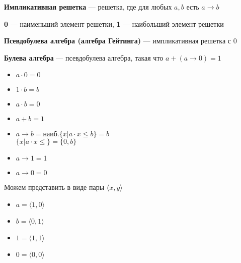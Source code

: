 \documentclass[oneside]{book}
\begin{document}
\begin{definition}
	\textbf{Импликативная решетка} --- решетка, где для любых \(a, b\) есть \(a \to b\)
	\label{org2d420d7}
\end{definition}
\begin{definition}
	\textbf{0} --- наименьший элемент решетки, \textbf{1} --- наибольший элемент решетки
	\label{orgc5f1084}
\end{definition}
\begin{definition}
	\textbf{Псевдобулева алгебра (алгебра Гейтинга)} --- импликативная решетка с \(0\)
	\label{orgb0b24d7}
\end{definition}
\begin{definition}
	\textbf{Булева алгебра} --- псевдобулева алгебра, такая что \(a + (a \to 0) = 1\)
	\label{org09eb6dc}
\end{definition}
\begin{examp}
	\-
	\begin{center}
	\end{center}
	\begin{itemize}
		\item \(a \cdot 0 = 0\)
		\item \(1\cdot b = b\)
		\item \(a \cdot b = 0\)
		\item \(a + b = 1\)
		\item \(a \to b = \text{наиб.}\{x \big| a\cdot x \le b\} = b\) \\
		      \(\{x \big| a \cdot x \le \} = \{0, b\}\)
		\item \(a \to 1 = 1\)
		\item \(a \to 0 = 0\)
	\end{itemize}
	Можем представить в виде пары \(\langle x, y \rangle\)
	\begin{itemize}
		\item \(a = \langle 1, 0 \rangle\)
		\item \(b = \langle 0 , 1\rangle\)
		\item \(1 = \langle 1, 1 \rangle\)
		\item \(0 = \langle 0, 0 \rangle\)
	\end{itemize}
	\label{org6201408}
\end{examp}
\end{document}
